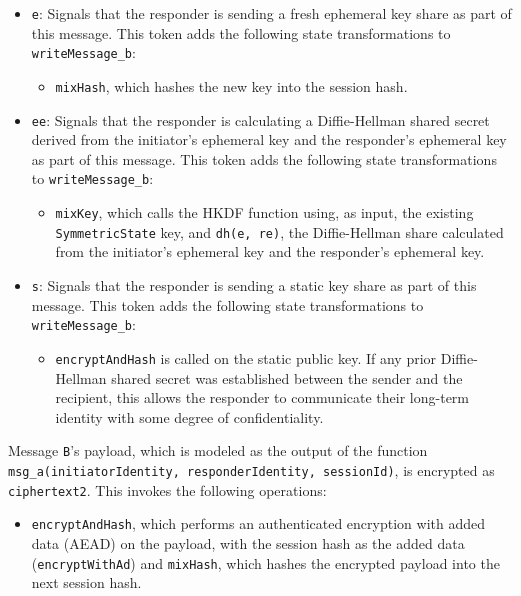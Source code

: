\begin{itemize}

\item \texttt{e}: Signals that the responder is sending a fresh ephemeral key share as part of this message. This token adds the following state transformations to \texttt{writeMessage\_b}:
\begin{itemize}

\item \texttt{mixHash}, which hashes the new key into the session hash.
\end{itemize}


\item \texttt{ee}: Signals that the responder is calculating a Diffie-Hellman shared secret derived from the initiator's ephemeral key and the responder's ephemeral key as part of this message. This token adds the following state transformations to \texttt{writeMessage\_b}:
\begin{itemize}

\item \texttt{mixKey}, which calls the HKDF function using, as input, the existing \texttt{SymmetricState} key, and \texttt{dh(e, re)}, the Diffie-Hellman share calculated from the initiator's ephemeral key and the responder's ephemeral key.
\end{itemize}


\item \texttt{s}: Signals that the responder is sending a static key share as part of this message. This token adds the following state transformations to \texttt{writeMessage\_b}:
\begin{itemize}

\item \texttt{encryptAndHash} is called on the static public key. If any prior Diffie-Hellman shared secret was established between the sender and the recipient, this allows the responder to communicate their long-term identity with some degree of confidentiality.
\end{itemize}


\end{itemize}
Message \texttt{B}'s payload, which is modeled as the output of the function \texttt{msg\_a(initiatorIdentity, responderIdentity, sessionId)}, is encrypted as \texttt{ciphertext2}. This invokes the following operations:


\begin{itemize}

\item \texttt{encryptAndHash}, which performs an authenticated encryption with added data (AEAD) on the payload, with the session hash as the added data (\texttt{encryptWithAd}) and \texttt{mixHash}, which hashes the encrypted payload into the next session hash.

\end{itemize}
